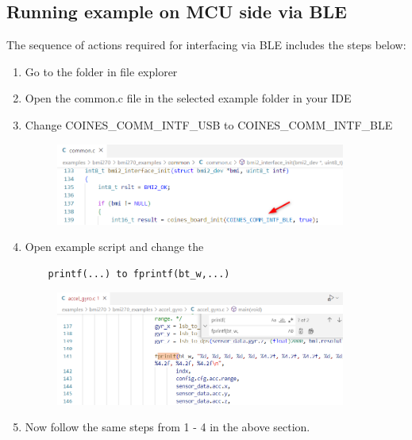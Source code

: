 \documentclass[11pt,headings=small]{scrartcl}
\begin{document}
\begin{enumerate}
\begin{figure}[H]
\begin{center}
		\end{center}
	\end{figure}
\end{enumerate}
\subsection{Running example on MCU side via BLE}
The sequence of actions required for interfacing via BLE includes the steps below:
\begin{enumerate}
	\item Go to the  folder in file explorer
	\item Open the common.c file in the selected example folder in your IDE
	\item Change COINES\_COMM\_INTF\_USB  to COINES\_COMM\_INTF\_BLE
	\begin{figure}[H]
		\begin{center}
			\includegraphics[width=0.9\textwidth]{coinesAPI_images/Mcu_example_ble_intf.png}
		\end{center}
	\end{figure}
	\item Open example script and change the 
	\begin{verbatim}
	printf(...) to fprintf(bt_w,...)
	\end{verbatim}
	\begin{figure}[H]
		\begin{center}
			\includegraphics[width=0.9\textwidth]{coinesAPI_images/Mcu_example_ble_print.png}
		\end{center}
	\end{figure}
	\item Now follow the same steps from 1 - 4 in the above section.

\end{enumerate}
\end{document}
